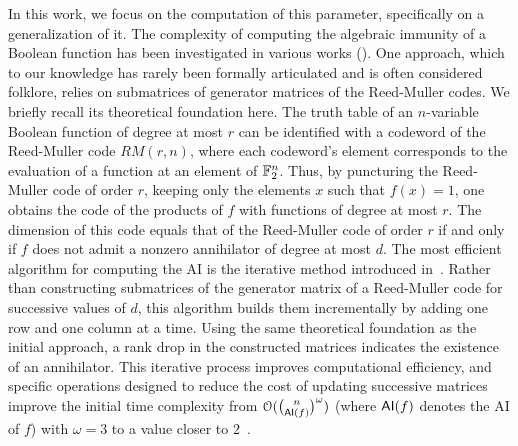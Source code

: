 \documentclass[11pt]{llncs}
\begin{document}
In this work, we focus on the computation of this parameter, specifically on a generalization of it.  
The complexity of computing the algebraic immunity of a Boolean function has been investigated in various works (\eg \cite{EC:CouMei03,EC:ACGKMR06,C:HawRos04,FSE:DidTil06}).  
One approach, which to our knowledge has rarely been formally articulated and is often considered folklore, relies on submatrices of generator matrices of the Reed-Muller codes. 
We briefly recall its theoretical foundation here. 
The truth table of an $n$-variable Boolean function of degree at most $r$ can be identified with a codeword of the Reed-Muller code $RM(r,n)$, where each codeword's element corresponds to the evaluation of a function at an element of $\mathbb{F}_2^n$.  
Thus, by puncturing the Reed-Muller code of order $r$, keeping only the elements $x$ such that $f(x) = 1$, one obtains the code of the products of $f$ with functions of degree at most $r$. 
The dimension of this code equals that of the Reed-Muller code of order $r$ if and only if $f$ does not admit a nonzero annihilator of degree at most $d$.  
The most efficient algorithm for computing the AI is the iterative method introduced in~\cite{EC:ACGKMR06}. 
Rather than constructing submatrices of the generator matrix of a Reed-Muller code for successive values of $d$, this algorithm builds them incrementally by adding one row and one column at a time. 
Using the same theoretical foundation as the initial approach, a rank drop in the constructed matrices indicates the existence of an annihilator. 
This iterative process improves computational efficiency, and specific operations designed to reduce the cost of updating successive matrices improve the initial time complexity from $\mathcal{O}(\binom{n}{\mathsf{AI}(f)}^\omega)$ (where $\mathsf{AI}(f)$ denotes the AI of $f$) with $\omega = 3$ to a value closer to $2$~\cite{EC:ACGKMR06,C:HawRos04}. 
\end{document}

